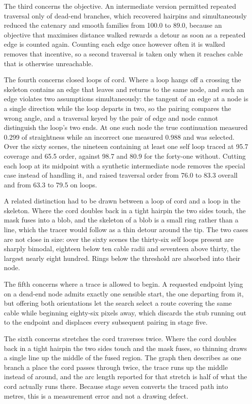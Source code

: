 The third concerns the objective. An intermediate version permitted repeated traversal only of dead-end branches, which recovered hairpins and simultaneously reduced the catenary and smooth families from 100.0 to 89.0, because an objective that maximises distance walked rewards a detour as soon as a repeated edge is counted again. Counting each edge once however often it is walked removes that incentive, so a second traversal is taken only when it reaches cable that is otherwise unreachable.

The fourth concerns closed loops of cord. Where a loop hangs off a crossing the skeleton contains an edge that leaves and returns to the same node, and such an edge violates two assumptions simultaneously: the tangent of an edge at a node is a single direction while the loop departs in two, so the pairing compares the wrong angle, and a traversal keyed by the pair of edge and node cannot distinguish the loop's two ends. At one such node the true continuation measured 0.299 of straightness while an incorrect one measured 0.988 and was selected. Over the sixty scenes, the nineteen containing at least one self loop traced at 95.7 coverage and 65.5 order, against 98.7 and 80.9 for the forty-one without. Cutting each loop at its midpoint with a synthetic intermediate node removes the special case instead of handling it, and raised traversal order from 76.0 to 83.3 overall and from 63.3 to 79.5 on loops.

A related distinction had to be drawn between a loop of cord and a loop in the skeleton. Where the cord doubles back in a tight hairpin the two sides touch, the mask fuses into a blob, and the skeleton of a blob is a small ring rather than a line, which the tracer would follow as a thin detour around the tip. The two cases are not close in size: over the sixty scenes the thirty-six self loops present are sharply bimodal, eighteen below ten cable radii and seventeen above thirty, the largest nearly eight hundred. Rings below the threshold are absorbed into their node.

The fifth concerns where a trace is allowed to begin. A requested endpoint lying on a dead-end node admits exactly one sensible start, the one departing from it, but offering both orientations let the search select a route covering the same cable while beginning eighty-six pixels away, which discards the stub running out to the endpoint and displaces every subsequent pairing in stage five.

The sixth concerns stretches the cord traverses twice. Where the cord doubles back in a tight hairpin the two sides touch and the mask fuses, so thinning draws a single line up the middle of the fused region. The graph then describes as one branch a place the cord passes through twice, the trace runs up the middle instead of around, and the arc length reported for that stretch is half of what the cord actually runs there. Because stage seven converts the traced path into metres, this is a measurement error and not a drawing defect.

